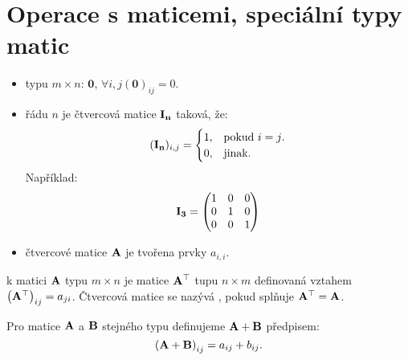 \section{Operace s maticemi, speciální typy matic}

\begin{definition}
    \leavevmode
    \begin{itemize}
        \item {} typu $m \times n$: $\mathbf{0}$, 
                $\forall{i,j} (\mathbf{0})_{ij} = 0$.
        \item {} řádu $n$ je čtvercová matice 
            $\mathbf{I_{n}}$ taková, že:
            \begin{equation*}
                (\mathbf{I_{n}})_{i,j} = \begin{cases}
                      1, & \text{pokud $i=j$}.\\
                      0, & \text{jinak}.
                        \end{cases}
            \end{equation*}
            Například: $$\mathbf{I_{3}} = \begin{pmatrix}
                            1 &0  &0\\
                            0 &1 &0\\
                            0 &0  &1
                    \end{pmatrix}$$
        \item {} čtvercové matice $\mathbf{A}$ je tvořena 
            prvky $a_{i,i}$.
    \end{itemize}
\end{definition}

\begin{definition}
     k matici $\mathbf{A}$ typu $m \times n$
    je matice $\mathbf{A}^{\top}$ tupu $n \times m$ definovaná vztahem
    $\left(\mathbf{A}^{\top}\right)_{ij} = a_{ji}$. 
    Čtvercová matice se nazývá , pokud splňuje 
    $\mathbf{A}^{\top} =  \mathbf{A}$.
\end{definition}

\begin{definition}
    Pro matice $\mathbf{A}$ a $\mathbf{B}$ stejného typu definujeme 
     $\mathbf{A}+\mathbf{B}$ předpisem: 
    $$\left(\mathbf{A} + \mathbf{B} \right)_{ij} = a_{ij} + b_{ij}.$$
\end{definition}

